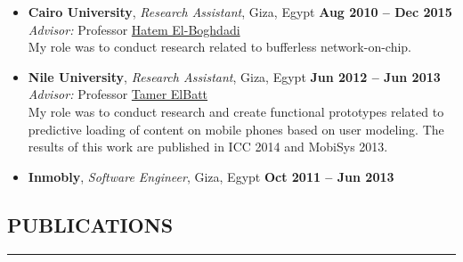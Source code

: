 \documentclass[10pt,a4]{article}
\begin{document}
\begin{itemize}
\item{\bf Cairo University}, {\it Research Assistant}, Giza, Egypt \hfill {\bf Aug 2010 -- Dec 2015}\\
{\it Advisor:} Professor \href{http://scholar.cu.edu.eg/?q=helboghdadi}{Hatem El-Boghdadi}\\
My role was to conduct research related to bufferless network-on-chip.

\item{\bf Nile University}, {\it Research Assistant}, Giza, Egypt \hfill {\bf Jun 2012 -- Jun 2013}\\
{\it Advisor:} Professor \href{https://sites.google.com/site/telbatt/}{Tamer ElBatt}\\
My role was to conduct research and create functional prototypes related to predictive loading of content on mobile phones based on user modeling. The results of this work are published in ICC 2014 and MobiSys 2013. 

\item{\bf Inmobly}, {\it Software Engineer}, Giza, Egypt \hfill {\bf Oct 2011 -- Jun 2013}

\end{itemize}

\subsection*{PUBLICATIONS}
\hrule
\vspace{0.2cm}
\end{document}
